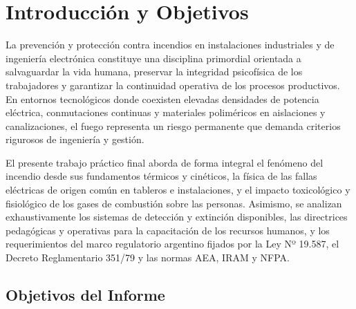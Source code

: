 \chapter{Introducción y Objetivos}
\label{sec.cap1:introduccion}

La prevención y protección contra incendios en instalaciones industriales y de ingeniería electrónica constituye una
disciplina primordial orientada a salvaguardar la vida humana, preservar la integridad psicofísica de los trabajadores y
garantizar la continuidad operativa de los procesos productivos. En entornos tecnológicos donde coexisten elevadas
densidades de potencia eléctrica, conmutaciones continuas y materiales poliméricos en aislaciones y canalizaciones, el
fuego representa un riesgo permanente que demanda criterios rigurosos de ingeniería y gestión.

El presente trabajo práctico final aborda de forma integral el fenómeno del incendio desde sus fundamentos térmicos y
cinéticos, la física de las fallas eléctricas de origen común en tableros e instalaciones, y el impacto toxicológico y
fisiológico de los gases de combustión sobre las personas. Asimismo, se analizan exhaustivamente los sistemas de
detección y extinción disponibles, las directrices pedagógicas y operativas para la capacitación de los recursos
humanos, y los requerimientos del marco regulatorio argentino fijados por la Ley Nº 19.587, el Decreto Reglamentario
351/79 y las normas AEA, IRAM y NFPA.

\section{Objetivos del Informe}

